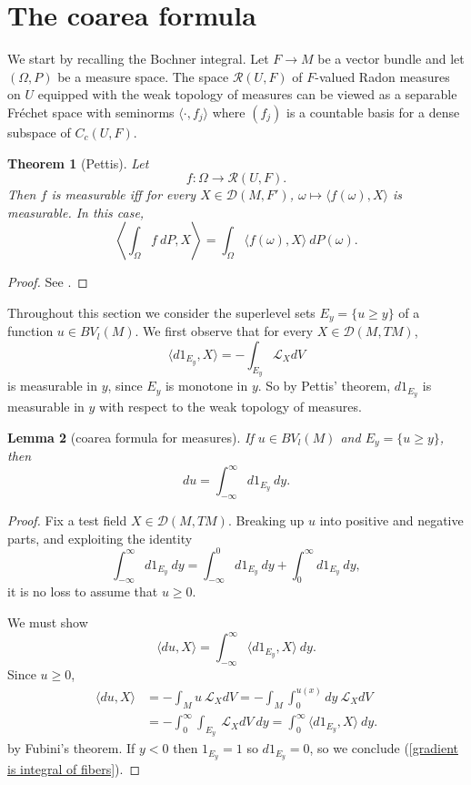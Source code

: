 \documentclass[reqno,12pt,letterpaper]{amsart}
\newtheorem{theorem}{Theorem}[section]
\newtheorem{lemma}[theorem]{Lemma}
\theoremstyle{definition}
\numberwithin{equation}{section}
\begin{document}

\appendix \section{The coarea formula} \label{coarea section}
We start by recalling the Bochner integral.
Let $F \to M$ be a vector bundle and let $(\Omega, P)$ be a measure space.
The space $\mathcal R(U, F)$ of $F$-valued Radon measures on $U$ equipped with the weak topology of measures can be viewed as a separable Fr\'echet space with seminorms $\langle \cdot, f_j\rangle$ where $(f_j)$ is a countable basis for a dense subspace of $C_c(U, F)$.

\begin{theorem}[Pettis]
Let
$$f: \Omega \to \mathcal R(U, F).$$
Then $f$ is measurable iff for every $X \in \mathcal D(M, F')$, $\omega \mapsto \langle f(\omega), X\rangle$ is measurable.
In this case,
$$\left\langle \int_\Omega f ~dP, X\right\rangle = \int_\Omega \langle f(\omega), X\rangle ~dP(\omega).$$
\end{theorem}
\begin{proof}
See \cite[Chapter V]{yosida2012functional}.
\end{proof}

Throughout this section we consider the superlevel sets $E_y = \{u \geq y\}$ of a function $u \in BV_l(M)$.
We first observe that for every $X \in \mathcal D(M, TM)$,
$$\langle d1_{E_y}, X\rangle = -\int_{E_y} \mathcal L_XdV$$
is measurable in $y$, since $E_y$ is monotone in $y$.
So by Pettis' theorem, $d1_{E_y}$ is measurable in $y$ with respect to the weak topology of measures.

\begin{lemma}[coarea formula for measures]\label{Coarea1}
If $u \in BV_l(M)$ and $E_y = \{u \geq y\}$, then
$$du = \int_{-\infty}^\infty d1_{E_y} ~dy.$$
\end{lemma}
\begin{proof}
Fix a test field $X \in \mathcal D(M, TM)$.
Breaking up $u$ into positive and negative parts, and exploiting the identity
$$\int_{-\infty}^\infty d1_{E_y} ~dy = \int_{-\infty}^0 d1_{E_y} ~dy + \int_0^\infty d1_{E_y} ~dy,$$
it is no loss to assume that $u \geq 0$.

We must show
\begin{equation}
\label{gradient is integral of fibers}
\langle du, X\rangle = \int_{-\infty}^\infty \langle d1_{E_y}, X\rangle ~dy.
\end{equation}
Since $u \geq 0$,
\begin{align*}
\langle du, X\rangle &= -\int_M u~\mathcal L_XdV = -\int_M \int_0^{u(x)} dy ~\mathcal L_XdV\\
&= -\int_0^\infty \int_{E_y} ~\mathcal L_XdV ~dy = \int_0^\infty \langle d1_{E_y}, X\rangle ~dy.
\end{align*}
by Fubini's theorem.
If $y < 0$ then $1_{E_y} = 1$ so $d1_{E_y} = 0$, so we conclude (\ref{gradient is integral of fibers}).
\end{proof}
\end{document}
